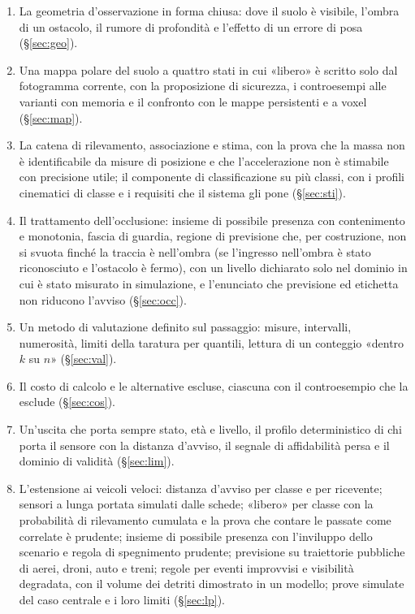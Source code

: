 \begin{enumerate}[label=\arabic*.]
\item La geometria d'osservazione in forma chiusa: dove il suolo è visibile, l'ombra di un ostacolo, il rumore di profondità e l'effetto di un errore di posa (\S\ref{sec:geo}).
\item Una mappa polare del suolo a quattro stati in cui «libero» è scritto solo dal fotogramma corrente, con la proposizione di sicurezza, i controesempi alle varianti con memoria e il confronto con le mappe persistenti e a voxel (\S\ref{sec:map}).
\item La catena di rilevamento, associazione e stima, con la prova che la massa non è identificabile da misure di posizione e che l'accelerazione non è stimabile con precisione utile; il componente di classificazione su più classi, con i profili cinematici di classe e i requisiti che il sistema gli pone (\S\ref{sec:sti}).
\item Il trattamento dell'occlusione: insieme di possibile presenza con contenimento e monotonia, fascia di guardia, regione di previsione che, per costruzione, non si svuota finché la traccia è nell'ombra (se l'ingresso nell'ombra è stato riconosciuto e l'ostacolo è fermo), con un livello dichiarato solo nel dominio in cui è stato misurato in simulazione, e l'enunciato che previsione ed etichetta non riducono l'avviso (\S\ref{sec:occ}).
\item Un metodo di valutazione definito sul passaggio: misure, intervalli, numerosità, limiti della taratura per quantili, lettura di un conteggio «dentro $k$ su $n$» (\S\ref{sec:val}).
\item Il costo di calcolo e le alternative escluse, ciascuna con il controesempio che la esclude (\S\ref{sec:cos}).
\item Un'uscita che porta sempre stato, età e livello, il profilo deterministico di chi porta il sensore con la distanza d'avviso, il segnale di affidabilità persa e il dominio di validità (\S\ref{sec:lim}).
\item L'estensione ai veicoli veloci: distanza d'avviso per classe e per ricevente; sensori a lunga portata simulati dalle schede; «libero» per classe con la probabilità di rilevamento cumulata e la prova che contare le passate come correlate è prudente; insieme di possibile presenza con l'inviluppo dello scenario e regola di spegnimento prudente; previsione su traiettorie pubbliche di aerei, droni, auto e treni; regole per eventi improvvisi e visibilità degradata, con il volume dei detriti dimostrato in un modello; prove simulate del caso centrale e i loro limiti (\S\ref{sec:lp}).
\end{enumerate}


